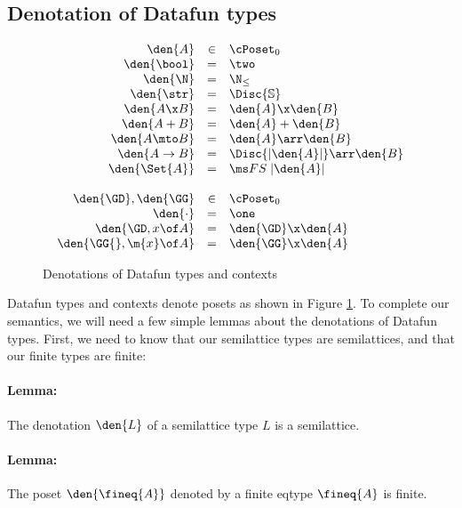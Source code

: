 \subsection{Denotation of Datafun types}
\begin{figure}
  \[\begin{array}{rcl}
  \den{A} &\in& \cPoset_0\\
  \den{\bool} &=& \two\\
  \den{\N} &=& \N_\le\\
  \den{\str} &=& \Disc{\mathbb{S}}\\
  \den{A \x B} &=& \den{A} \x \den{B}\\
  \den{A + B} &=& \den{A} + \den{B}\\
  \den{A \mto B} &=& \den{A} \arr \den{B}\\
  \den{A \uto B} &=& \Disc{\U{\den{A}}} \arr \den{B}\\
  \den{\Set{A}} &=& \FS{\U{\den{A}}}%
  \\\\
  \den{\GD}, \den{\GG} &\in& \cPoset_0\\
  \den{\cdot} &=& \one\\
  \den{\GD, x\of A} &=& \den{\GD} \x \den{A}\\
  \den{\GG{}, \m{x}\of A} &=& \den{\GG} \x \den{A}
  \end{array}\]
  \caption{Denotations of Datafun types and contexts}
  \label{fig:sem-types}
\end{figure}

Datafun types and contexts denote posets as shown in Figure \ref{fig:sem-types}.
To complete our semantics, we will need a few simple lemmas about the
denotations of Datafun types. First, we need to know that our semilattice types
are semilattices, and that our finite types are finite:


\paragraph{Lemma:}
The denotation $\den{L}$ of a semilattice type $L$ is a semilattice.

\paragraph{Lemma:}
The poset $\den{\fineq{A}}$ denoted by a finite eqtype $\fineq{A}$ is finite.

